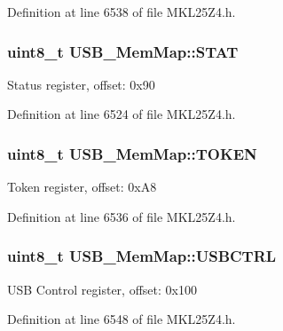 Definition at line 6538 of file M\+K\+L25\+Z4.\+h.

\subsubsection[{\texorpdfstring{S\+T\+AT}{STAT}}]{\setlength{\rightskip}{0pt plus 5cm}uint8\+\_\+t U\+S\+B\+\_\+\+Mem\+Map\+::\+S\+T\+AT}\hypertarget{struct_u_s_b___mem_map_acad1a20eb41fab37316b6b7b98c00053}{}\label{struct_u_s_b___mem_map_acad1a20eb41fab37316b6b7b98c00053}
Status register, offset\+: 0x90 

Definition at line 6524 of file M\+K\+L25\+Z4.\+h.

\subsubsection[{\texorpdfstring{T\+O\+K\+EN}{TOKEN}}]{\setlength{\rightskip}{0pt plus 5cm}uint8\+\_\+t U\+S\+B\+\_\+\+Mem\+Map\+::\+T\+O\+K\+EN}\hypertarget{struct_u_s_b___mem_map_a8806f493a96bf80f94a1b04fd5a595a7}{}\label{struct_u_s_b___mem_map_a8806f493a96bf80f94a1b04fd5a595a7}
Token register, offset\+: 0x\+A8 

Definition at line 6536 of file M\+K\+L25\+Z4.\+h.

\subsubsection[{\texorpdfstring{U\+S\+B\+C\+T\+RL}{USBCTRL}}]{\setlength{\rightskip}{0pt plus 5cm}uint8\+\_\+t U\+S\+B\+\_\+\+Mem\+Map\+::\+U\+S\+B\+C\+T\+RL}\hypertarget{struct_u_s_b___mem_map_a593a3dc10eb92a0dab6f62dbda5f0209}{}\label{struct_u_s_b___mem_map_a593a3dc10eb92a0dab6f62dbda5f0209}
U\+SB Control register, offset\+: 0x100 

Definition at line 6548 of file M\+K\+L25\+Z4.\+h.


